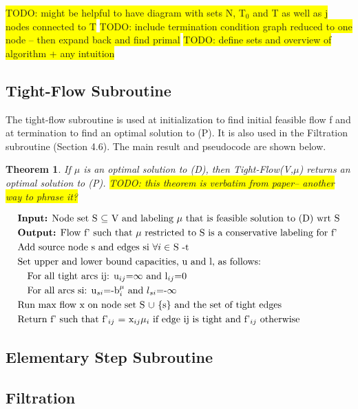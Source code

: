 \documentclass[11pt]{article}
\newtheorem{theorem}{Theorem}[section]
\theoremstyle{definition}
\theoremstyle{definition}
\newcommand{\todo}[1]{\colorbox{yellow}{TODO: #1}}
\begin{document}
\todo{might be helpful to have diagram with sets N, T$_0$ and T as well as j nodes connected to T} 
\todo{include termination condition graph reduced to one node -- then expand back and find primal}
\todo{define sets and overview of algorithm + any intuition}
\subsection{Tight-Flow Subroutine}
The tight-flow subroutine is used at initialization to find initial feasible flow f and at termination to find an optimal solution to (P). It is also used in the Filtration subroutine (Section 4.6). The main result and pseudocode are shown below. 
\begin{theorem}
If $\mu$ is an optimal solution to (D), then Tight-Flow(V,$\mu$) returns an optimal solution to (P). \todo{this theorem is verbatim from paper-- another way to phrase it?}
\end{theorem}

\begin{align*}
&\text{\textbf{Input:} Node set S $\subseteq$ V and labeling $\mu$ that is feasible solution to (D) wrt S} \\
&\text{\textbf{Output:} Flow f' such that $\mu$ restricted to S is a conservative labeling for f'} \\
&\text{Add source node s and edges si $\forall i \in$ S -t} \\
&\text{Set upper and lower bound capacities, u and l, as follows: } \\
&\quad \text{For all tight arcs ij: u$_{ij}$=$\infty$ and l$_{ij}$=0} \\
&\quad \text{For all arcs si: u$_{si}$=-b$_i^\mu$ and $l_{si}$=-$\infty$} \\
&\text{Run max flow x on node set S $\cup$ $\{$s$\}$ and the set of tight edges} \\
&\text{Return f' such that f'$_{ij}$ = x$_{ij}\mu_i$ if edge ij is tight and f'$_{ij}$ otherwise}
\end{align*}

\subsection{Elementary Step Subroutine}

\subsection{Filtration}
\end{document}
